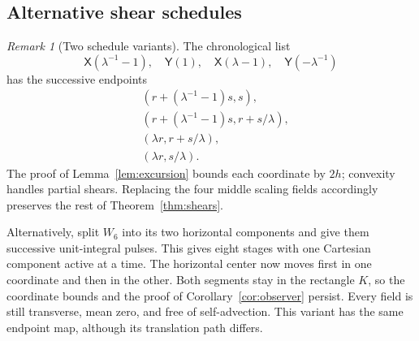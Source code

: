 \documentclass[11pt]{article}
\theoremstyle{remark}
\newtheorem{remark}[theorem]{Remark}
\begin{document}
\subsection{Alternative shear schedules}
\begin{remark}[Two schedule variants]\label{rem:variants}
The chronological list
\[
 \mathsf X(\lambda^{-1}-1),\quad \mathsf Y(1),\quad
 \mathsf X(\lambda-1),\quad \mathsf Y(-\lambda^{-1})
\]
has the successive endpoints
\begin{align*}
 &(r+(\lambda^{-1}-1)s,s),\\
 &(r+(\lambda^{-1}-1)s,r+s/\lambda),\\
 &(\lambda r,r+s/\lambda),\\
 &(\lambda r,s/\lambda).
\end{align*}
The proof of Lemma~\ref{lem:excursion} bounds each coordinate by $2h$;
convexity handles partial shears. Replacing the four middle scaling
fields accordingly preserves the rest of Theorem~\ref{thm:shears}.

Alternatively, split $W_6$ into its two horizontal components and give
them successive unit-integral pulses. This gives eight stages with
one Cartesian component active at a time. The horizontal center now
moves first in one coordinate and then in the other. Both segments
stay in the rectangle $K$, so the coordinate bounds and the proof of
Corollary~\ref{cor:observer} persist. Every field is still transverse,
mean zero, and free of self-advection. This variant has the same
endpoint map, although its translation path differs.
\end{remark}
\end{document}
